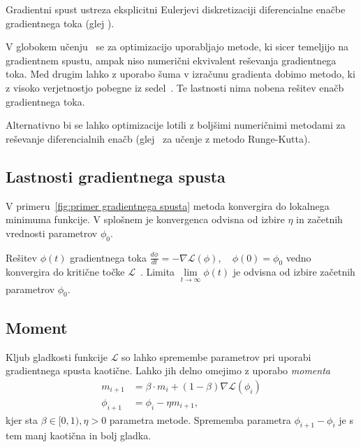 \documentclass[mat2, tisk]{fmfdelo}
\newcommand{\TODO}[1]{{\color{blue} TODO: #1}}
\newcommand{\loss}{\mathcal L}
\begin{document}
Gradientni spust ustreza eksplicitni Eulerjevi diskretizaciji
diferencialne enačbe gradientnega toka (glej
\cite{dherin2025learningsolvingdifferentialequations}).

\begin{opomba}
  V globokem učenju~\cite{optimizationmethods2021survey} se za
  optimizacijo uporabljajo
  metode, ki sicer temeljijo na gradientnem spustu, ampak
  niso numerični ekvivalent reševanja gradientnega toka.
  Med drugim lahko z uporabo šuma v izračunu gradienta
  dobimo metodo, ki z visoko verjetnostjo pobegne iz
  sedel~\cite{jin2017escapesaddlepointsefficiently}. Te lastnosti
  nima nobena rešitev enačb gradientnega toka.

  Alternativno bi se lahko optimizacije lotili z boljšimi numeričnimi
  metodami za reševanje diferencialnih enačb
  (glej~\cite{dherin2025learningsolvingdifferentialequations}
  za učenje z metodo Runge-Kutta).
\end{opomba}

\subsection{Lastnosti gradientnega spusta}
V primeru~\ref{fig:primer gradientnega spusta} metoda konvergira do
lokalnega minimuma funkcije.
V splošnem je konvergenca odvisna od izbire  $\eta$ in začetnih
vrednosti parametrov $\phi_0$.

Rešitev $\phi(t)$ gradientnega toka $  \frac{d\phi}{d t} = - \nabla
\mathcal{L}(\phi), \quad \phi(0)=\phi_0$ vedno konvergira do
kritične točke $\loss$~\cite[stran 203]{Hirsch2012dynamical-systems}.
Limita $\lim \limits_{t \to \infty} \phi(t)$
je odvisna od izbire začetnih parametrov $\phi_0$.
%
\subsection{Moment}
Kljub gladkosti funkcije $\loss$ so lahko spremembe parametrov pri
uporabi gradientnega spusta kaotične. Lahko jih delno omejimo z
uporabo \emph{momenta}~\cite[stran 86]{prince2023understandingdeeplearning}
\begin{align*}
  m_{i+1} &= \beta \cdot m_i + (1-\beta) \nabla \loss (\phi_i) \\
  \phi_{i+1} &= \phi_i -  \eta m_{i+1},
\end{align*}
kjer sta $\beta \in [0,1), \eta > 0$ parametra metode. Sprememba
parametra $\phi_{i+1} - \phi_i$ je s tem manj kaotična in bolj gladka.
\end{document}
